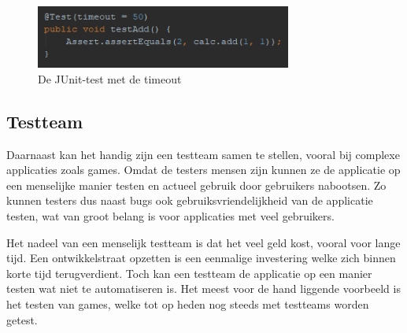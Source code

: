 \documentclass[12pt]{article}
\begin{document}
\begin{figure}[H]
	\begin{center}
		\includegraphics[width=0.75\textwidth]{images/junit_test.png}
		\caption{De JUnit-test met de timeout\label{fig:junit_test}}
	\end{center}
\end{figure}

\subsection{Testteam}
Daarnaast kan het handig zijn een testteam samen te stellen, vooral bij complexe applicaties zoals games. Omdat de testers mensen zijn kunnen ze de applicatie op een menselijke manier testen en actueel gebruik door gebruikers nabootsen. Zo kunnen testers dus naast bugs ook gebruiksvriendelijkheid van de applicatie testen, wat van groot belang is voor applicaties met veel gebruikers.

Het nadeel van een menselijk testteam is dat het veel geld kost, vooral voor lange tijd. Een ontwikkelstraat opzetten is een eenmalige investering welke zich binnen korte tijd terugverdient. Toch kan een testteam de applicatie op een manier testen wat niet te automatiseren is. Het meest voor de hand liggende voorbeeld is het testen van games, welke tot op heden nog steeds met testteams worden getest.
\end{document}
